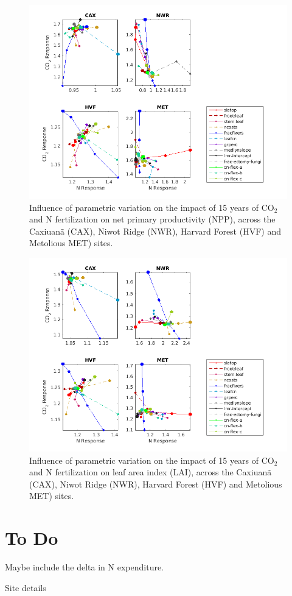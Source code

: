 \documentclass[draft,linenumbers]{agujournal}
\begin{document}
 \begin{figure}[h]
     \centering
     \includegraphics[width=1.55\textwidth, left]{matlab/figures/NOVc_CNdep_NPP1__p2012.png}
     \caption{Influence of parametric variation on the impact of 15 years of CO$_{2}$ and N fertilization on net primary productivity (NPP), across the Caxiuan\~a (CAX), Niwot Ridge (NWR), Harvard Forest (HVF) and Metolious MET) sites.}
     \label{NPP CO2 and N respones 2001}
  \end{figure}
  
  \begin{figure}[h]
     \centering
     \includegraphics[width=1.55\textwidth, left]{matlab/figures/NOVc_CNdep_TLAI1__p2012.png}
     \caption{Influence of parametric variation on the impact of 15 years of CO$_{2}$ and N fertilization on leaf area index (LAI), across the Caxiuan\~a (CAX), Niwot Ridge (NWR), Harvard Forest (HVF) and Metolious MET) sites.}
     \label{LAI CO2 and N respones 2001}
  \end{figure}
  


\section{To Do}
Maybe include the delta in N expenditure. 

Site details
\end{document}

